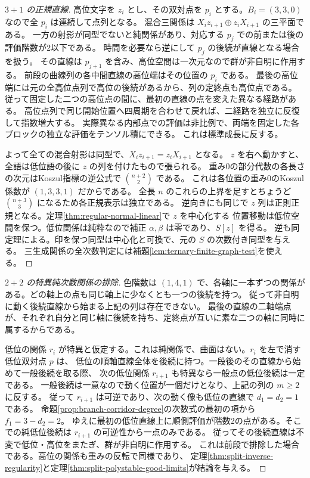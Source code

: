\begin{proof}[$3+1$ の正規直線]
高位文字を $z_i$ とし、その双対点を $p_i$ とする。$B_i=(3,3,0)$ なので全 $p_i$ は連続して点列となる。
混合三関係は $X_i z_{i+1}\oplus z_i X_{i+1}$ の三平面である。
一方の射影が同型でないと純関係があり、対応する $p_j$ での前または後の評価階数が2以下である。
時間を必要なら逆にして $p_j$ の後続が直線となる場合を扱う。
その直線は $p_{j+1}$ を含み、高位空間は一次元なので群が非自明に作用する。
前段の曲線列の各中間直線の高位端はその位置の $p_i$ である。
最後の高位端には元の全高位点列で高位の後続があるから、列の定終点も高位点である。
従って固定した二つの高位点の間に、最初の直線の点を変えた異なる経路がある。
高位点列で同じ開始位置へ四周期を合わせて戻れば、二経路を独立に反復して指数増大する。
実際異なる内部点での評価は非比例で、両端を固定した各ブロックの独立な評価をテンソル積にできる。
これは標準成長に反する。

よって全ての混合射影は同型で、$X_i z_{i+1}=z_i X_{i+1}$ となる。
$z$ を右へ動かすと、全語は低位語の後に $z$ の列を付けたもので張られる。
重み0の部分代数の各長さの次元はKoszul指標の逆公式で $\binom{n+2}{2}$ である。
これは各位置の重み0のKoszul係数が $(1,3,3,1)$ だからである。
全長 $n$ のこれらの上界を足すとちょうど $\binom{n+3}{3}$ になるため各正規表示は独立である。
逆向きにも同じで $z$ 列は正則正規となる。定理\ref{thm:regular-normal-linear}で $z$ を中心化する
位置移動は低位空間を保つ。低位関係は純粋なので補正 $\alpha,\beta$ は零であり、$S[z]$ を得る。
逆も同定理による。印を保つ同型は中心化と可換で、元の $S$ の次数付き同型を与える。
三生成関係の全次数判定には補題\ref{lem:ternary-finite-graph-test}を使える。
\end{proof}

\begin{proof}[$2+2$ の特異純次数関係の排除]
色階数は $(1,4,1)$ で、各軸に一本ずつの関係がある。どの軸上の点も同じ軸上に少なくとも一つの後続を持つ。
従って非自明に動く後続直線から始まる上記の列は存在できない。
最後の直線の二軸端点が、それぞれ自分と同じ軸に後続を持ち、定終点が互いに素な二つの軸に同時に属するからである。

低位の関係 $r_i$ が特異と仮定する。これは純関係で、曲面はない。$r_i$ を左で消す低位双対点 $p$ は、
低位の順軸直線全体を後続に持つ。一段後のその直線から始めて一般後続を取る際、
次の低位関係 $r_{i+1}$ も特異なら一般点の低位後続は一定である。
一般後続は一意なので動く位置が一個だけとなり、上記の列の $m\ge2$ に反する。
従って $r_{i+1}$ は可逆であり、次の動く像も低位の直線で $d_1=d_2=1$ である。
命題\ref{prop:branch-corridor-degree}の次数式の最初の項から $f_1=3-d_2=2$。
ゆえに最初の低位直線上に順側評価が階数2の点がある。そこでの純低位後続は $r_{i+1}$ の可逆性から一点のみである。
従ってその後続直線は不変で低位・高位をまたぎ、群が非自明に作用する。
これは前段で排除した場合である。高位の関係も重みの反転で同様であり、
定理\ref{thm:split-inverse-regularity}と定理\ref{thm:split-polystable-good-limits}が結論を与える。
\end{proof}


